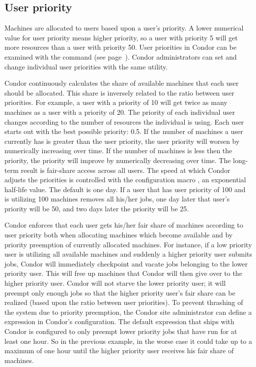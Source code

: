 \subsection{\label{sec:user-priority-explained}User priority}

Machines are allocated to users based upon a user's priority.
A lower numerical value for user priority means higher priority,
so a user with priority 5 will get more resources than
a user with priority 50.
User priorities in Condor can be examined with the 
command (see page~\pageref{man-condor-userprio}).
Condor administrators can set and change individual user priorities
with the same utility.

Condor continuously calculates the share of available machines that each
user should be allocated.    This share is inversely related to the ratio
between user priorities.
For example, a user with a priority of 10 will get twice as many
machines as a user with a priority of 20.
The priority of each individual user changes according to
the number of resources the individual is using.
Each user starts out with the best possible priority: 0.5.
If the number of machines a user currently has is greater than 
the user priority,
the user priority will worsen by numerically increasing over time.
If the number of machines is less then the priority,
the priority will improve by numerically decreasing over time. 
The long-term result is fair-share access across all users.
The speed at which Condor adjusts the priorities is
controlled with the configuration macro ,
an exponential half-life value.
The default is one day.
If a user that has user priority of 100 and is
utilizing 100 machines removes all his/her jobs,
one day later that user's
priority will be 50, and two days later the priority will be 25.

Condor enforces that each user gets his/her fair share of machines
according to user priority both when allocating machines which become
available and by priority preemption of currently allocated machines.
For instance, if a low priority user is utilizing all available machines
and suddenly a higher priority user submits jobs, Condor will
immediately checkpoint and vacate jobs belonging to the lower priority
user. This will free up machines that Condor will then give over to the
higher priority user. Condor will not starve the lower priority user; it
will preempt only enough jobs so that the higher priority user's fair
share can be realized (based upon the ratio between user priorities). To
prevent thrashing of the system due to priority preemption, the Condor 
site administrator can define a  expression in Condor's configuration.
The default expression that ships with Condor is configured to only preempt 
lower priority jobs that have run
for at least one hour. So in the previous example, in the worse case it
could take up to a maximum of one hour until the higher priority user
receives his fair share of machines. 

